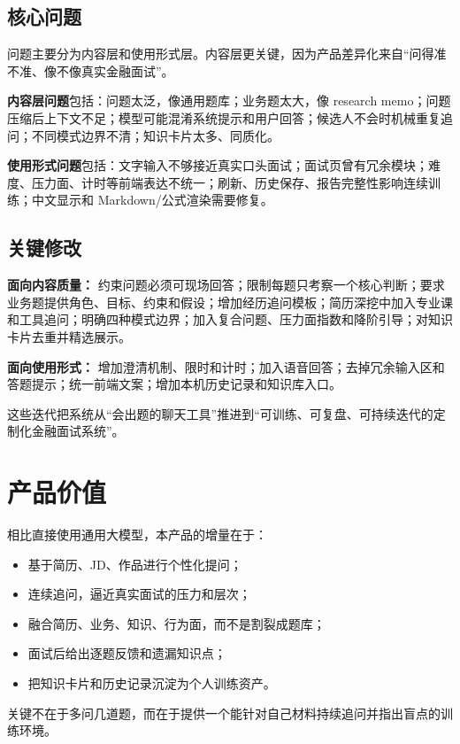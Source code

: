 \documentclass[10pt,a4paper]{ctexart}
\begin{document}
\subsection{核心问题}

问题主要分为内容层和使用形式层。内容层更关键，因为产品差异化来自“问得准不准、像不像真实金融面试”。

\textbf{内容层问题}包括：问题太泛，像通用题库；业务题太大，像 research memo；问题压缩后上下文不足；模型可能混淆系统提示和用户回答；候选人不会时机械重复追问；不同模式边界不清；知识卡片太多、同质化。

\textbf{使用形式问题}包括：文字输入不够接近真实口头面试；面试页曾有冗余模块；难度、压力面、计时等前端表达不统一；刷新、历史保存、报告完整性影响连续训练；中文显示和 Markdown/公式渲染需要修复。

\subsection{关键修改}

\textbf{面向内容质量：} 约束问题必须可现场回答；限制每题只考察一个核心判断；要求业务题提供角色、目标、约束和假设；增加经历追问模板；简历深挖中加入专业课和工具追问；明确四种模式边界；加入复合问题、压力面指数和降阶引导；对知识卡片去重并精选展示。

\textbf{面向使用形式：} 增加澄清机制、限时和计时；加入语音回答；去掉冗余输入区和答题提示；统一前端文案；增加本机历史记录和知识库入口。

这些迭代把系统从“会出题的聊天工具”推进到“可训练、可复盘、可持续迭代的定制化金融面试系统”。

\section{产品价值}

相比直接使用通用大模型，本产品的增量在于：

\begin{itemize}
  \item 基于简历、JD、作品进行个性化提问；
  \item 连续追问，逼近真实面试的压力和层次；
  \item 融合简历、业务、知识、行为面，而不是割裂成题库；
  \item 面试后给出逐题反馈和遗漏知识点；
  \item 把知识卡片和历史记录沉淀为个人训练资产。
\end{itemize}

关键不在于多问几道题，而在于提供一个能针对自己材料持续追问并指出盲点的训练环境。
\end{document}
